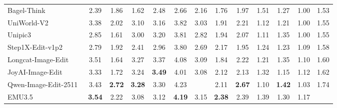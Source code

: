 \begin{table}[t]
{\begin{tabular}{l|cccccc|cccccc}
            Bagel-Think~\cite{deng2025emerging}
            & 2.39 & 1.86 & 1.62 & 2.48 & 2.66 & \cellcolor[HTML]{C8C8C8}2.16 & 1.76 & 1.97 & 1.51 & 1.27 & 1.00
            & \cellcolor[HTML]{C8C8C8}1.53 \\

            UniWorld-V2~\cite{li2025uniworld}
            & 3.38 & 2.02 & 3.10 & 3.16 & 3.82 & \cellcolor[HTML]{C8C8C8}3.03 & 1.91 & 2.21 & 1.12 & 1.21 & 1.00
            & \cellcolor[HTML]{C8C8C8}1.55  \\

            Unipic3~\cite{wei2026skywork}
            & 2.85 & 1.61 & 3.00 & 3.20 & 3.81 & \cellcolor[HTML]{C8C8C8}2.82 & 1.94 & 2.07 & 1.11 & 1.35 & 1.00
            & \cellcolor[HTML]{C8C8C8}1.55 \\

            Step1X-Edit-v1p2~\cite{liu2025step1x}
            & 2.79 & 1.92 & 2.41 & 2.96 & 3.80 & \cellcolor[HTML]{C8C8C8}2.69 & 2.17 & 1.95 & 1.24 & 1.23 & 1.09
            & \cellcolor[HTML]{C8C8C8}1.58 \\

            Longcat-Image-Edit~\cite{team2025longcat}
            & 3.51 & 1.64 & 3.27 & 3.37 & 4.08 & \cellcolor[HTML]{C8C8C8}3.09  & 1.84 & 2.22 & 1.21 & 1.35 & 1.10
            & \cellcolor[HTML]{C8C8C8}1.60 \\

            JoyAI-Image-Edit~\cite{joyaiimage2026}
            & 3.33 & 1.72 & 3.24 & \color[HTML]{F88825}\textbf{3.49} & 4.01 & \cellcolor[HTML]{C8C8C8}3.08 & 2.12 & 2.13 & 1.32 & 1.15 & 1.12
            & \cellcolor[HTML]{C8C8C8}1.62 \\

            Qwen-Image-Edit-2511~\cite{wu2025qwen}
            & 3.43 & \color[HTML]{F88825}\textbf{2.72} & \color[HTML]{F88825}\textbf{3.28} & 3.30 & 4.23 & \cellcolor[HTML]{C8C8C8}{\color[HTML]{F88825}\textbf{3.32}} & 2.11 & \color[HTML]{F88825}\textbf{2.67} & 1.10 & \color[HTML]{F88825}\textbf{1.42} & 1.03
            & \cellcolor[HTML]{C8C8C8}1.74 \\

            EMU3.5~\cite{cui2025emu3}
            & \color[HTML]{F88825}\textbf{3.54} & 2.22 & 3.08 & 3.12 & \color[HTML]{F88825}\textbf{4.19} & \cellcolor[HTML]{C8C8C8}3.15 & \color[HTML]{F88825}\textbf{2.38} & 2.39 & 1.39 & 1.30 & 1.17
            & \cellcolor[HTML]{C8C8C8}{\color[HTML]{F88825}\textbf{1.79}} \\ 

            


\end{tabular}}
\end{table}
